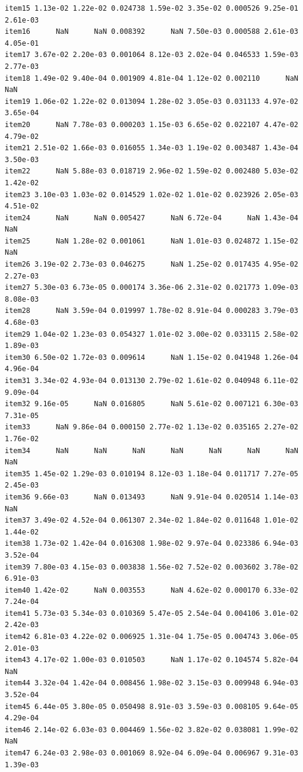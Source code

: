 \documentclass[
  a4paper,
]{ltjsbook}
\begin{document}
\begin{verbatim}
item15 1.13e-02 1.22e-02 0.024738 1.59e-02 3.35e-02 0.000526 9.25e-01 2.61e-03
item16      NaN      NaN 0.008392      NaN 7.50e-03 0.000588 2.61e-03 4.05e-01
item17 3.67e-02 2.20e-03 0.001064 8.12e-03 2.02e-04 0.046533 1.59e-03 2.77e-03
item18 1.49e-02 9.40e-04 0.001909 4.81e-04 1.12e-02 0.002110      NaN      NaN
item19 1.06e-02 1.22e-02 0.013094 1.28e-02 3.05e-03 0.031133 4.97e-02 3.65e-04
item20      NaN 7.78e-03 0.000203 1.15e-03 6.65e-02 0.022107 4.47e-02 4.79e-02
item21 2.51e-02 1.66e-03 0.016055 1.34e-03 1.19e-02 0.003487 1.43e-04 3.50e-03
item22      NaN 5.88e-03 0.018719 2.96e-02 1.59e-02 0.002480 5.03e-02 1.42e-02
item23 3.10e-03 1.03e-02 0.014529 1.02e-02 1.01e-02 0.023926 2.05e-03 4.51e-02
item24      NaN      NaN 0.005427      NaN 6.72e-04      NaN 1.43e-04      NaN
item25      NaN 1.28e-02 0.001061      NaN 1.01e-03 0.024872 1.15e-02      NaN
item26 3.19e-02 2.73e-03 0.046275      NaN 1.25e-02 0.017435 4.95e-02 2.27e-03
item27 5.30e-03 6.73e-05 0.000174 3.36e-06 2.31e-02 0.021773 1.09e-03 8.08e-03
item28      NaN 3.59e-04 0.019997 1.78e-02 8.91e-04 0.000283 3.79e-03 4.68e-03
item29 1.04e-02 1.23e-03 0.054327 1.01e-02 3.00e-02 0.033115 2.58e-02 1.89e-03
item30 6.50e-02 1.72e-03 0.009614      NaN 1.15e-02 0.041948 1.26e-04 4.96e-04
item31 3.34e-02 4.93e-04 0.013130 2.79e-02 1.61e-02 0.040948 6.11e-02 9.09e-04
item32 9.16e-05      NaN 0.016805      NaN 5.61e-02 0.007121 6.30e-03 7.31e-05
item33      NaN 9.86e-04 0.000150 2.77e-02 1.13e-02 0.035165 2.27e-02 1.76e-02
item34      NaN      NaN      NaN      NaN      NaN      NaN      NaN      NaN
item35 1.45e-02 1.29e-03 0.010194 8.12e-03 1.18e-04 0.011717 7.27e-05 2.45e-03
item36 9.66e-03      NaN 0.013493      NaN 9.91e-04 0.020514 1.14e-03      NaN
item37 3.49e-02 4.52e-04 0.061307 2.34e-02 1.84e-02 0.011648 1.01e-02 1.44e-02
item38 1.73e-02 1.42e-04 0.016308 1.98e-02 9.97e-04 0.023386 6.94e-03 3.52e-04
item39 7.80e-03 4.15e-03 0.003838 1.56e-02 7.52e-02 0.003602 3.78e-02 6.91e-03
item40 1.42e-02      NaN 0.003553      NaN 4.62e-02 0.000170 6.33e-02 7.24e-04
item41 5.73e-03 5.34e-03 0.010369 5.47e-05 2.54e-04 0.004106 3.01e-02 2.42e-03
item42 6.81e-03 4.22e-02 0.006925 1.31e-04 1.75e-05 0.004743 3.06e-05 2.01e-03
item43 4.17e-02 1.00e-03 0.010503      NaN 1.17e-02 0.104574 5.82e-04      NaN
item44 3.32e-04 1.42e-04 0.008456 1.98e-02 3.15e-03 0.009948 6.94e-03 3.52e-04
item45 6.44e-05 3.80e-05 0.050498 8.91e-03 3.59e-03 0.008105 9.64e-05 4.29e-04
item46 2.14e-02 6.03e-03 0.004469 1.56e-02 3.82e-02 0.038081 1.99e-02      NaN
item47 6.24e-03 2.98e-03 0.001069 8.92e-04 6.09e-04 0.006967 9.31e-03 1.39e-03

\end{verbatim}
\end{document}
